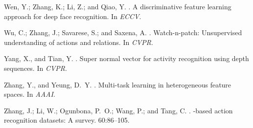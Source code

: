\documentclass[letterpaper]{article} %
\begin{document}
\begin{thebibliography}{}
Wen, Y.; Zhang, K.; Li, Z.; and Qiao, Y.
.
\newblock A discriminative feature learning approach for deep face recognition.
\newblock In {\em ECCV}.

Wu, C.; Zhang, J.; Savarese, S.; and Saxena, A.
.
\newblock Watch-n-patch: Unsupervised understanding of actions and relations.
\newblock In {\em CVPR}.

Yang, X., and Tian, Y.
.
\newblock Super normal vector for activity recognition using depth sequences.
\newblock In {\em CVPR}.

Zhang, Y., and Yeung, D.~Y.
.
\newblock Multi-task learning in heterogeneous feature spaces.
\newblock In {\em AAAI}.

Zhang, J.; Li, W.; Ogunbona, P.~O.; Wang, P.; and Tang, C.
.
-based action recognition datasets: A survey.
 60:86--105.

\end{thebibliography}
\end{document}
